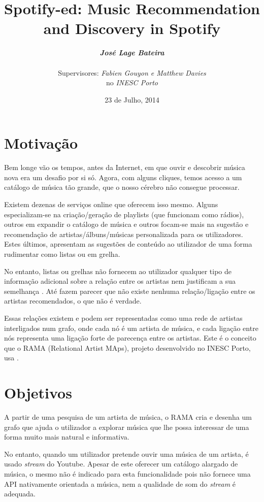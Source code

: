 \documentclass[twocolumn]{article}
\title{
  \huge
  \textbf{
    Spotify-ed: Music Recommendation and Discovery in Spotify
  }
}
\author{
  \large{\emph{\textbf{José Lage Bateira}}} \\ \\
  Supervisores: \emph{Fabien Gouyon e Matthew Davies}  \\
  no \emph{INESC Porto}
}
\date{23 de Julho, 2014}
\begin{document}
\maketitle

\thispagestyle{empty}

\section{Motivação}\label{sec:motiva}

  Bem longe vão os tempos, antes da Internet, em que ouvir e descobrir música nova era um desafio por si só.
  Agora, com alguns cliques, temos acesso a um catálogo de música tão grande, que o nosso cérebro não consegue processar.

  Existem dezenas de serviços online que oferecem isso mesmo.
  Alguns especializam-se na criação/geração de playlists (que funcionam como rádios), outros em expandir o catálogo de música e outros focam-se mais na sugestão e recomendação de artistas/álbuns/músicas personalizada para os utilizadores.
  Estes últimos, apresentam as sugestões de conteúdo ao utilizador de uma forma rudimentar como listas ou em grelha.

  No entanto, listas ou grelhas não fornecem ao utilizador qualquer tipo de informação adicional sobre a relação entre os artistas nem justificam a sua semelhança \cite{Lamere2008}.
  Até fazem parecer que não existe nenhuma relação/ligação entre os artistas recomendados, o que não é verdade.

  Essas relações existem e podem ser representadas como uma rede de artistas interligados num grafo, onde cada nó é um artista de música, e cada ligação entre nós representa uma ligação forte de parecença entre os artistas.
  Este é o conceito que o RAMA (Relational Artist MAps), projeto desenvolvido no INESC Porto, usa \cite{Costa2008} \cite{Sarmento2009} \cite{Costa2009} \cite{Gouyon2011}.

\section{Objetivos}\label{sec:goals}

  A partir de uma pesquisa de um artista de música, o RAMA cria e desenha um grafo que ajuda o utilizador a explorar música que lhe possa interessar de uma forma muito mais natural e informativa.

  No entanto, quando um utilizador pretende ouvir uma música de um artista, é usado \emph{stream} do Youtube. 
  Apesar de este oferecer um catálogo alargado de música, o mesmo não é indicado para esta funcionalidade pois não fornece uma API nativamente orientada a música, nem a qualidade de som do \emph{stream} é adequada.
\end{document}
